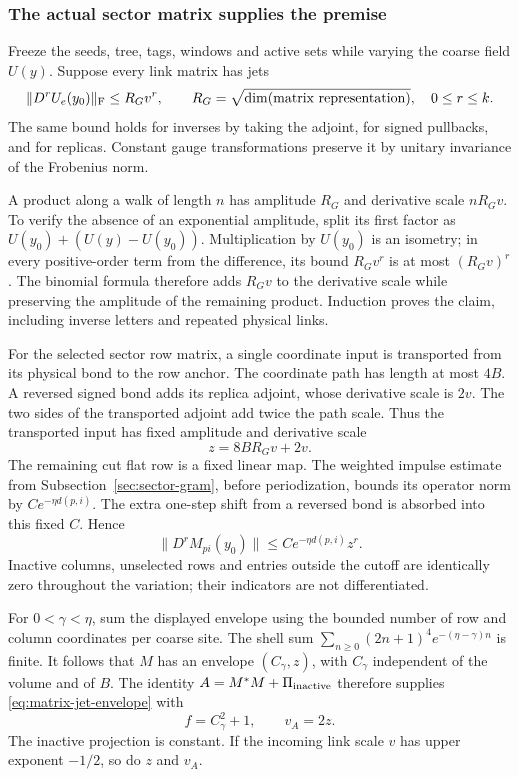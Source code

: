 \subsubsection{The actual sector matrix supplies the premise}
Freeze the seeds, tree, tags, windows and active sets while varying
the coarse field $U(y)$. Suppose every link matrix has jets
\[
 \|D^r U_e(y_0)\|_{\rm F}\le R_G v^r,
 \qquad R_G=\sqrt{\dim(\text{matrix representation})},
 \quad0\le r\le k.
\]
The same bound holds for inverses by taking the adjoint, for signed
pullbacks, and for replicas. Constant gauge transformations preserve
it by unitary invariance of the Frobenius norm.

A product along a walk of length $n$ has amplitude $R_G$ and
derivative scale $nR_Gv$. To verify the absence of an exponential
amplitude, split its first factor as $U(y_0)+(U(y)-U(y_0))$.
Multiplication by $U(y_0)$ is an isometry; in every positive-order
term from the difference, its bound $R_Gv^r$ is at most
$(R_Gv)^r$. The binomial formula therefore adds $R_Gv$ to the
derivative scale while preserving the amplitude of the remaining
product. Induction proves the claim, including inverse letters and
repeated physical links.

For the selected sector row matrix, a single coordinate input is
transported from its physical bond to the row anchor. The coordinate
path has length at most $4B$. A reversed signed bond adds its replica
adjoint, whose derivative scale is $2v$. The two sides of the
transported adjoint add twice the path scale. Thus the transported
input has fixed amplitude and derivative scale
\begin{equation}\label{eq:normalization-kernel-growth}
 z=8BR_Gv+2v.
\end{equation}
The remaining cut flat row is a fixed linear map. The weighted impulse
estimate from Subsection~\ref{sec:sector-gram}, before periodization,
bounds its operator norm by $C e^{-\eta d(p,i)}$. The extra one-step
shift from a reversed bond is absorbed into this fixed $C$. Hence
\[
 \|D^rM_{pi}(y_0)\|\le C e^{-\eta d(p,i)}z^r.
\]
Inactive columns, unselected rows and entries outside the cutoff are
identically zero throughout the variation; their indicators are not
differentiated.

For $0<\gamma<\eta$, sum the displayed envelope using the bounded
number of row and column coordinates per coarse site. The shell sum
$\sum_{n\ge0}(2n+1)^4e^{-(\eta-\gamma)n}$ is finite. It follows
that $M$ has an envelope $(C_\gamma,z)$, with $C_\gamma$ independent
of the volume and of $B$. The identity
$A=M^*M+\Pi_{\rm inactive}$ therefore supplies
\eqref{eq:matrix-jet-envelope} with
\[
 f=C_\gamma^2+1,\qquad v_A=2z.
\]
The inactive projection is constant. If the incoming link scale $v$
has upper exponent $-1/2$, so do $z$ and $v_A$.

